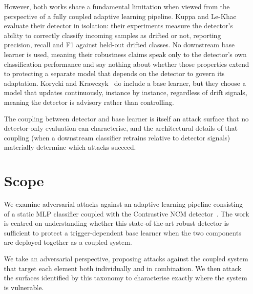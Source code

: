However, both works share a fundamental limitation when viewed from the perspective of a fully coupled adaptive learning pipeline. Kuppa and Le-Khac~\cite{Kuppa_2022} evaluate their detector in isolation: their experiments measure the detector's ability to correctly classify incoming samples as drifted or not, reporting precision, recall and F1 against held-out drifted classes. No downstream base learner is used, meaning their robustness claims speak only to the detector's own classification performance and say nothing about whether those properties extend to protecting a separate model that depends on the detector to govern its adaptation. Korycki and Krawczyk~\cite{Korycki_2022} do include a base learner, but they choose a model that updates continuously, instance by instance, regardless of drift signals, meaning the detector is advisory rather than controlling.

The coupling between detector and base learner is itself an attack surface that no detector-only evaluation can characterise, and the architectural details of that coupling (when a downstream classifier retrains relative to detector signals) materially determine which attacks succeed.

\section{Scope}
\label{sec:scope}
We examine adversarial attacks against an adaptive learning pipeline consisting of a static MLP classifier coupled with the Contrastive NCM detector~\cite{Kuppa_2022}. The work is centred on understanding whether this state-of-the-art robust detector is sufficient to protect a trigger-dependent base learner when the two components are deployed together as a coupled system.

We take an adversarial perspective, proposing attacks against the coupled system that target each element both individually and in combination. We then attack the surfaces identified by this taxonomy to characterise exactly where the system is vulnerable.


